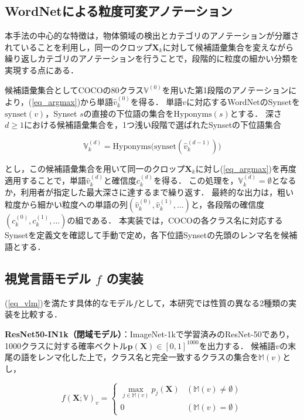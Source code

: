 \subsection{WordNetによる粒度可変アノテーション}
本手法の中心的な特徴は，物体領域の検出とカテゴリのアノテーションが分離されていることを利用し，同一のクロップ$ {\mathbf X}_k $に対して候補語彙集合を変えながら繰り返しカテゴリのアノテーションを行うことで，段階的に粒度の細かい分類を実現する点にある．

候補語彙集合としてCOCOの80クラス$ {\mathbb V}^{(0)} $を用いた第1段階のアノテーションにより，(\ref{eq_argmax})から単語$ \hat{v}_k^{(0)} $を得る．
単語$ v $に対応するWordNetのSynsetを$ \mathrm{synset}(v) $，Synset $ s $の直接の下位語の集合を$ \mathrm{Hyponyms}(s) $とする．
深さ$ d \geq 1 $における候補語彙集合を，1つ浅い段階で選ばれたSynsetの下位語集合

\begin{equation}
    {\mathbb V}_k^{(d)} = \mathrm{Hyponyms}\bigl( \mathrm{synset}( \hat{v}_k^{(d-1)} ) \bigr)
    \label{eq_hyponym}
\end{equation}

\noindent
とし，この候補語彙集合を用いて同一のクロップ$ {\mathbf X}_k $に対し(\ref{eq_argmax})を再度適用することで，単語$ \hat{v}_k^{(d)} $と確信度$ c_k^{(d)} $を得る．
この処理を，$ {\mathbb V}_k^{(d)} = \emptyset $となるか，利用者が指定した最大深さに達するまで繰り返す．
最終的な出力は，粗い粒度から細かい粒度への単語の列$ ( \hat{v}_k^{(0)}, \hat{v}_k^{(1)}, \ldots ) $と，各段階の確信度$ ( c_k^{(0)}, c_k^{(1)}, \ldots ) $の組である．
本実装では，COCOの各クラス名に対応するSynsetを定義文を確認して手動で定め，各下位語Synsetの先頭のレンマ名を候補語とする．

\subsection{視覚言語モデル $ f $ の実装}
(\ref{eq_vlm})を満たす具体的なモデル$ f $として，本研究では性質の異なる2種類の実装を比較する．

{\bf ResNet50-IN1k（閉域モデル）}：ImageNet-1k\cite{ref_ImageNet}で学習済みのResNet-50\cite{ref_ResNet}であり，1000クラスに対する確率ベクトル$ {\mathbf p}({\mathbf X}) \in [0, 1]^{1000} $を出力する．
候補語$ v $の末尾の語をレンマ化した上で，クラス名と完全一致するクラスの集合を$ {\mathbb M}(v) $とし，

\begin{equation}
    f({\mathbf X}; {\mathbb V})_v =
    \begin{cases}
        \max_{j \in {\mathbb M}(v)} p_j({\mathbf X}) & ({\mathbb M}(v) \neq \emptyset) \\
        0 & ({\mathbb M}(v) = \emptyset)
    \end{cases}
    \label{eq_resnet}
\end{equation}

